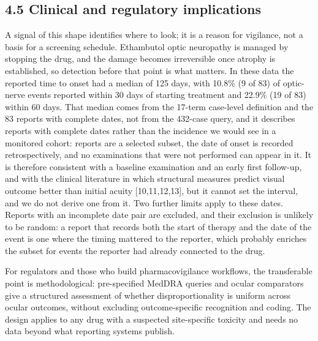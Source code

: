 \documentclass[12pt,a4paper]{article}
\begin{document}
\subsection*{4.5 Clinical and regulatory implications}

A signal of this shape identifies where to look; it is a reason for vigilance, not a basis for a screening schedule. Ethambutol optic neuropathy is managed by stopping the drug, and the damage becomes irreversible once atrophy is established, so detection before that point is what matters. In these data the reported time to onset had a median of 125 days, with 10.8\% (9 of 83) of optic-nerve events reported within 30 days of starting treatment and 22.9\% (19 of 83) within 60 days. That median comes from the 17-term case-level definition and the 83 reports with complete dates, not from the 432-case query, and it describes reports with complete dates rather than the incidence we would see in a monitored cohort: reports are a selected subset, the date of onset is recorded retrospectively, and no examinations that were not performed can appear in it. It is therefore consistent with a baseline examination and an early first follow-up, and with the clinical literature in which structural measures predict visual outcome better than initial acuity [10,11,12,13], but it cannot set the interval, and we do not derive one from it. Two further limits apply to these dates. Reports with an incomplete date pair are excluded, and their exclusion is unlikely to be random: a report that records both the start of therapy and the date of the event is one where the timing mattered to the reporter, which probably enriches the subset for events the reporter had already connected to the drug.

For regulators and those who build pharmacovigilance workflows, the transferable point is methodological: pre-specified MedDRA queries and ocular comparators give a structured assessment of whether disproportionality is uniform across ocular outcomes, without excluding outcome-specific recognition and coding. The design applies to any drug with a suspected site-specific toxicity and needs no data beyond what reporting systems publish.
\end{document}
